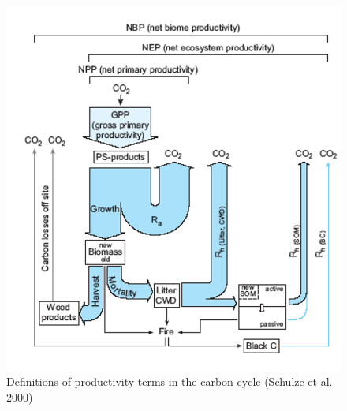 \documentclass[12pt,oneside]{book}
\begin{document}
\begin{figure}

{\centering \includegraphics[width=0.8\linewidth]{figures/chap5/f53_GPP_NBP} 

}

\caption{Definitions of productivity terms in the carbon cycle (Schulze et al. 2000)}\label{fig:f53}
\end{figure}
\end{document}
